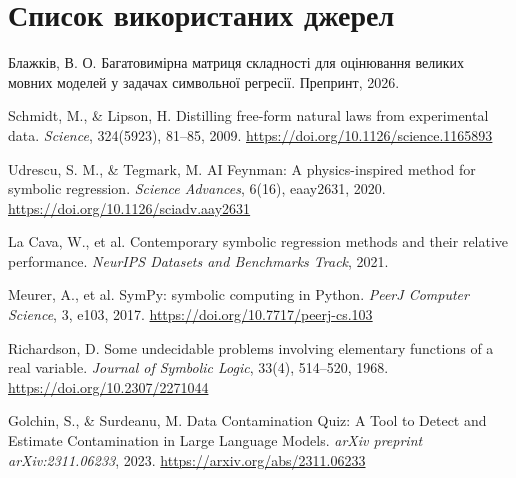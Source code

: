 \documentclass[11pt]{article}
\begin{document}
\section*{Список використаних джерел}

\begin{enumerate}[label={[{\arabic*}]}]
  \item Блажків, В. О. Багатовимірна матриця складності для оцінювання великих мовних моделей у задачах символьної регресії. Препринт, 2026.
  \item Schmidt, M., \& Lipson, H. Distilling free-form natural laws from experimental data. \textit{Science}, 324(5923), 81--85, 2009. \url{https://doi.org/10.1126/science.1165893}
  \item Udrescu, S. M., \& Tegmark, M. AI Feynman: A physics-inspired method for symbolic regression. \textit{Science Advances}, 6(16), eaay2631, 2020. \url{https://doi.org/10.1126/sciadv.aay2631}
  \item La Cava, W., et al. Contemporary symbolic regression methods and their relative performance. \textit{NeurIPS Datasets and Benchmarks Track}, 2021.
  \item Meurer, A., et al. SymPy: symbolic computing in Python. \textit{PeerJ Computer Science}, 3, e103, 2017. \url{https://doi.org/10.7717/peerj-cs.103}
  \item Richardson, D. Some undecidable problems involving elementary functions of a real variable. \textit{Journal of Symbolic Logic}, 33(4), 514--520, 1968. \url{https://doi.org/10.2307/2271044}
  \item Golchin, S., \& Surdeanu, M. Data Contamination Quiz: A Tool to Detect and Estimate Contamination in Large Language Models. \textit{arXiv preprint arXiv:2311.06233}, 2023. \url{https://arxiv.org/abs/2311.06233}
\end{enumerate}
\end{document}
